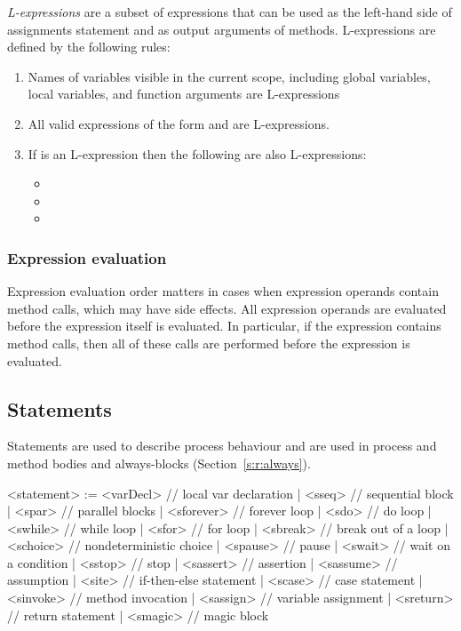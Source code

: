 \emph{L-expressions} are a subset of \tsl expressions that can be 
used as the left-hand side of assignments statement and as output 
arguments of methods.  L-expressions are defined by the following 
rules:
\begin{enumerate}
    \item Names of variables visible in the current scope, 
        including global variables, local variables, and function 
        arguments are L-expressions
    \item All valid expressions of the form  and 
         are L-expressions.
    \item If  is an L-expression then the following are 
        also L-expressions:
        \begin{itemize}
            \item {}
            \item {}
            \item {}
        \end{itemize}
\end{enumerate}

\subsubsection{Expression evaluation}

Expression evaluation order matters in cases when expression 
operands contain method calls, which may have side effects.  
 All expression operands are 
evaluated before the expression itself is evaluated.  In 
particular, if the expression contains method calls, then all of 
these calls are performed before the expression is evaluated.

\subsection{Statements}

Statements are used to describe process behaviour and are used in 
process and method bodies and always-blocks 
(Section~\ref{s:r:always}).

\begin{bnflisting}
<statement> := <varDecl>  // local var declaration
             | <sseq>     // sequential block
             | <spar>     // parallel blocks
             | <sforever> // forever loop
             | <sdo>      // do loop
             | <swhile>   // while loop
             | <sfor>     // for loop
             | <sbreak>   // break out of a loop
             | <schoice>  // nondeterministic choice
             | <spause>   // pause
             | <swait>    // wait on a condition
             | <sstop>    // stop
             | <sassert>  // assertion
             | <sassume>  // assumption
             | <site>     // if-then-else statement
             | <scase>    // case statement
             | <sinvoke>  // method invocation
             | <sassign>  // variable assignment
             | <sreturn>  // return statement
             | <smagic>   // magic block
\end{bnflisting}

